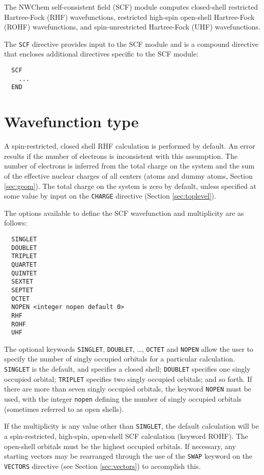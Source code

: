 \label{sec:scf}

The NWChem self-consistent field (SCF) module computes closed-shell
restricted Hartree-Fock (RHF) wavefunctions, restricted high-spin
open-shell Hartree-Fock (ROHF) wavefunctions, and spin-unrestricted
Hartree-Fock (UHF) wavefunctions.

The \verb+SCF+ directive provides input to the SCF module and is a
compound directive that encloses additional directives specific to the
SCF module:
\begin{verbatim}
  SCF
    ...
  END
\end{verbatim}

\section{Wavefunction type}

A spin-restricted, closed shell RHF calculation is performed by
default.  An error results if the number of electrons is inconsistent
with this assumption.  The number of electrons is inferred from the
total charge on the system and the sum of the effective nuclear
charges of all centers (atoms and dummy atoms, Section
\ref{sec:geom}).  The total charge on the system is zero by default,
unless specified at some value by input on the \verb+CHARGE+ directive
(Section \ref{sec:toplevel}).

The options available to define the SCF wavefunction and multiplicity
are as follows:

\begin{verbatim}
  SINGLET 
  DOUBLET 
  TRIPLET 
  QUARTET 
  QUINTET 
  SEXTET
  SEPTET
  OCTET
  NOPEN <integer nopen default 0>
  RHF
  ROHF
  UHF
\end{verbatim}

The optional keywords \verb+SINGLET+, \verb+DOUBLET+, \ldots,
\verb+OCTET+ and \verb+NOPEN+ allow the user to specify the number of
singly occupied orbitals for a particular calculation.  \verb+SINGLET+
is the default, and specifies a closed shell; \verb+DOUBLET+ specifies
one singly occupied orbital; \verb+TRIPLET+ specifies two singly
occupied orbitals; and so forth.  If there are more than seven singly
occupied orbitals, the keyword \verb+NOPEN+ must be used, with the
integer \verb+nopen+ defining the number of singly occupied
orbitals (sometimes referred to as open shells).

If the multiplicity is any value other than \verb+SINGLET+, the
default calculation will be a spin-restricted, high-spin, open-shell
SCF calculation (keyword ROHF).  The open-shell orbitals must be the
highest occupied orbitals.  If necessary, any starting vectors may be
rearranged through the use of the \verb+SWAP+ keyword on the
\verb+VECTORS+ directive (see Section \ref{sec:vectors}) to accomplish
this.

